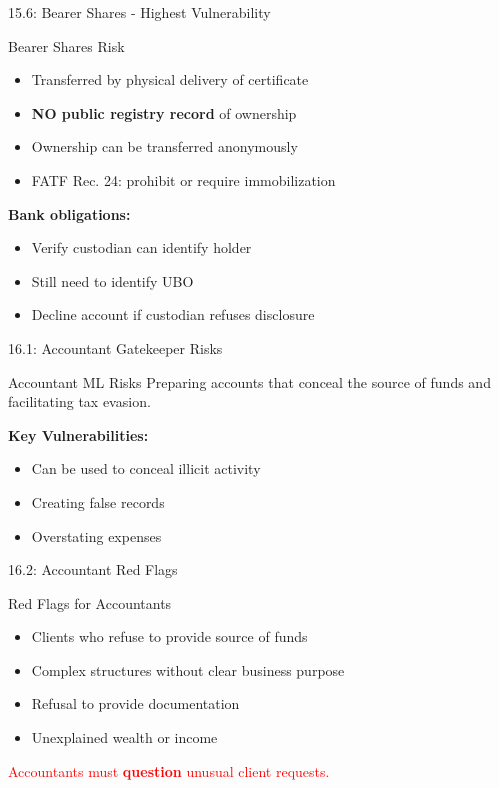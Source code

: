 \documentclass{beamer}
\begin{document}
	\begin{frame}{15.6: Bearer Shares - Highest Vulnerability}
		\begin{block}{Bearer Shares Risk}
			\begin{itemize}
				\item Transferred by physical delivery of certificate
				\item \textbf{NO public registry record} of ownership
				\item Ownership can be transferred anonymously
				\item FATF Rec. 24: prohibit or require immobilization
			\end{itemize}
		\end{block}
		\textbf{Bank obligations:}
		\begin{itemize}
			\item Verify custodian can identify holder
			\item Still need to identify UBO
			\item Decline account if custodian refuses disclosure
		\end{itemize}
	\end{frame}
	
	
	\begin{frame}{16.1: Accountant Gatekeeper Risks}
		\begin{block}{Accountant ML Risks}
			Preparing accounts that conceal the source of funds and facilitating tax evasion.
		\end{block}
		\textbf{Key Vulnerabilities:}
		\begin{itemize}
			\item Can be used to conceal illicit activity
			\item Creating false records
			\item Overstating expenses
		\end{itemize}
	\end{frame}
	
	\begin{frame}{16.2: Accountant Red Flags}
		\begin{block}{Red Flags for Accountants}
			\begin{itemize}
				\item Clients who refuse to provide source of funds
				\item Complex structures without clear business purpose
				\item Refusal to provide documentation
				\item Unexplained wealth or income
			\end{itemize}
		\end{block}
		\textcolor{red}{Accountants must \textbf{question} unusual client requests.}
	\end{frame}
	
\end{document}

